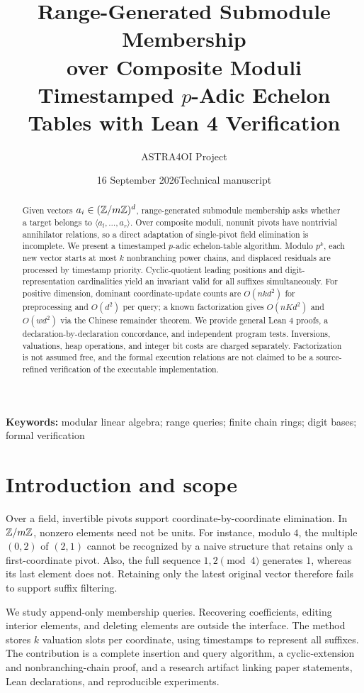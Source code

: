 \documentclass[11pt,a4paper]{article}
\title{Range-Generated Submodule Membership\\over Composite Moduli\\[0.4em]\large Timestamped $p$-Adic Echelon Tables with Lean 4 Verification}
\author{ASTRA4OI Project}
\date{16 September 2026\quad Technical manuscript}
\theoremstyle{definition}
\theoremstyle{plain}
\begin{document}
\maketitle
\begin{abstract}
Given vectors $a_i\in(\mathbb Z/m\mathbb Z)^d$, range-generated submodule membership asks whether a target belongs to
$\langle a_l,\ldots,a_r\rangle$. Over composite moduli, nonunit pivots have nontrivial annihilator relations,
so a direct adaptation of single-pivot field elimination is incomplete. We present a timestamped
$p$-adic echelon-table algorithm. Modulo $p^k$, each new vector starts at most $k$ nonbranching power
chains, and displaced residuals are processed by timestamp priority. Cyclic-quotient leading positions
and digit-representation cardinalities yield an invariant valid for all suffixes simultaneously.
For positive dimension, dominant coordinate-update counts are $O(nkd^2)$ for preprocessing and $O(d^2)$
per query; a known factorization gives $O(nKd^2)$ and $O(wd^2)$ via the Chinese remainder theorem.
We provide general Lean 4 proofs, a declaration-by-declaration concordance, and independent program tests.
Inversions, valuations, heap operations, and integer bit costs are charged separately. Factorization
is not assumed free, and the formal execution relations are not claimed to be a source-refined
verification of the executable implementation.
\end{abstract}
\noindent\textbf{Keywords:} modular linear algebra; range queries; finite chain rings; digit bases; formal verification

\section{Introduction and scope}
Over a field, invertible pivots support coordinate-by-coordinate elimination. In $\mathbb Z/m\mathbb Z$, nonzero
elements need not be units. For instance, modulo $4$, the multiple $(0,2)$ of $(2,1)$ cannot be
recognized by a naive structure that retains only a first-coordinate pivot. Also, the full sequence
$1,2\pmod4$ generates $1$, whereas its last element does not. Retaining only the latest original
vector therefore fails to support suffix filtering.

We study append-only membership queries. Recovering coefficients, editing interior elements, and
deleting elements are outside the interface. The method stores $k$ valuation slots per coordinate,
using timestamps to represent all suffixes. The contribution is a complete insertion and query
algorithm, a cyclic-extension and nonbranching-chain proof, and a research artifact linking paper
statements, Lean declarations, and reproducible experiments.
\end{document}
